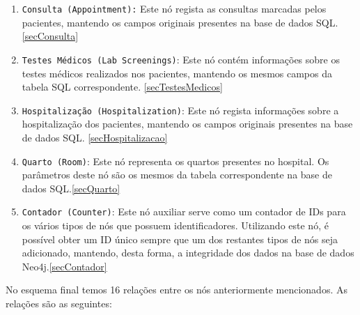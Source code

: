 \begin{enumerate}
    \item \texttt{Consulta (Appointment):} Este nó regista as consultas marcadas pelos pacientes, mantendo os campos originais presentes na base de dados SQL. \ref{secConsulta}
    \item \texttt{Testes Médicos (Lab Screenings)}: Este nó contém informações sobre os testes médicos realizados nos pacientes, mantendo os mesmos campos da tabela SQL correspondente. \ref{secTestesMedicos}
    \item \texttt{Hospitalização (Hospitalization)}: Este nó regista informações sobre a hospitalização dos pacientes, mantendo os campos originais presentes na base de dados SQL. \ref{secHospitalizacao}
    \item \texttt{Quarto (Room)}: Este nó representa os quartos presentes no hospital. Os parâmetros deste nó são os mesmos da tabela correspondente na base de dados SQL.\ref{secQuarto}
    \item \texttt{Contador (Counter)}: Este nó auxiliar serve como um contador de IDs para os vários tipos de nós que possuem identificadores. Utilizando este nó, é possível obter um ID único sempre que um dos restantes tipos de nós seja adicionado, mantendo, desta forma, a integridade dos dados na base de dados Neo4j.\ref{secContador}
\end{enumerate}

No esquema final temos 16 relações entre os nós anteriormente mencionados. As relações são as seguintes:

